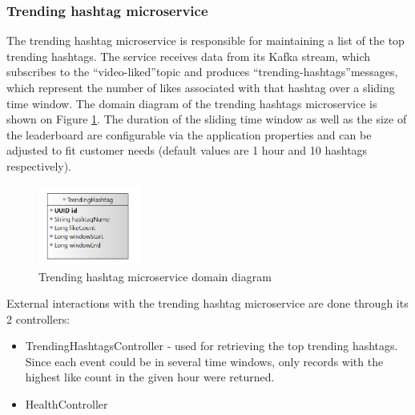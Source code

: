 \documentclass[parskip=full]{article}
\begin{document}
    \subsubsection{Trending hashtag microservice}
    The trending hashtag microservice is responsible for maintaining a list of the top trending hashtags.
    The service receives data from its Kafka stream, which subscribes to the ``video-liked''topic and produces ``trending-hashtags''messages, which represent the number of likes associated with that hashtag over a sliding time window.
    The domain diagram of the trending hashtags microservice is shown on Figure \ref{fig:thmDomain}.
    The duration of the sliding time window as well as the size of the leaderboard are configurable via the application properties and can be adjusted to fit customer needs (default values are 1 hour and 10 hashtags respectively).

    \begin{figure}
        \includegraphics[width=0.3\textwidth]{thm-domain-diagram}
        \caption{Trending hashtag microservice domain diagram}
        \label{fig:thmDomain}
    \end{figure}

    External interactions with the trending hashtag microservice are done through its 2 controllers:

    \begin{itemize}
        \item TrendingHashtagsController - used for retrieving the top trending hashtags.
        Since each event could be in several time windows, only records with the highest like count in the given hour were returned.
        \item HealthController
    \end{itemize}
\end{document}
